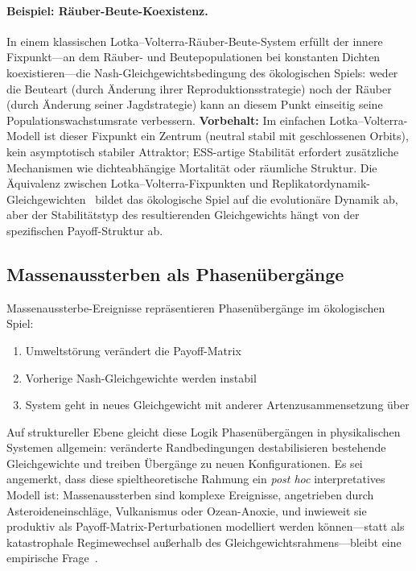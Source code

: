 \documentclass[12pt,a4paper]{article}
\theoremstyle{remark}
\begin{document}
\paragraph{Beispiel: Räuber-Beute-Koexistenz.}
In einem klassischen Lotka--Volterra-Räuber-Beute-System erfüllt der innere Fixpunkt---an dem Räuber- und Beutepopulationen bei konstanten Dichten koexistieren---die Nash-Gleichgewichtsbedingung des ökologischen Spiels: weder die Beuteart (durch Änderung ihrer Reproduktionsstrategie) noch der Räuber (durch Änderung seiner Jagdstrategie) kann an diesem Punkt einseitig seine Populationswachstumsrate verbessern. \textbf{Vorbehalt:} Im einfachen Lotka--Volterra-Modell ist dieser Fixpunkt ein Zentrum (neutral stabil mit geschlossenen Orbits), kein asymptotisch stabiler Attraktor; ESS-artige Stabilität erfordert zusätzliche Mechanismen wie dichteabhängige Mortalität oder räumliche Struktur. Die Äquivalenz zwischen Lotka--Volterra-Fixpunkten und Replikatordynamik-Gleichgewichten~\citep{HofbauerSigmund1998} bildet das ökologische Spiel auf die evolutionäre Dynamik ab, aber der Stabilitätstyp des resultierenden Gleichgewichts hängt von der spezifischen Payoff-Struktur ab.

\subsection{Massenaussterben als Phasenübergänge}

Massenaussterbe-Ereignisse repräsentieren Phasenübergänge im ökologischen Spiel:
\begin{enumerate}
    \item Umweltstörung verändert die Payoff-Matrix
    \item Vorherige Nash-Gleichgewichte werden instabil
    \item System geht in neues Gleichgewicht mit anderer Artenzusammensetzung über
\end{enumerate}

Auf struktureller Ebene gleicht diese Logik Phasenübergängen in physikalischen Systemen allgemein: veränderte Randbedingungen destabilisieren bestehende Gleichgewichte und treiben Übergänge zu neuen Konfigurationen. Es sei angemerkt, dass diese spieltheoretische Rahmung ein \emph{post hoc} interpretatives Modell ist: Massenaussterben sind komplexe Ereignisse, angetrieben durch Asteroideneinschläge, Vulkanismus oder Ozean-Anoxie, und inwieweit sie produktiv als Payoff-Matrix-Perturbationen modelliert werden können---statt als katastrophale Regimewechsel außerhalb des Gleichgewichtsrahmens---bleibt eine empirische Frage~\citep{GouldEldredge1977}.
\end{document}
